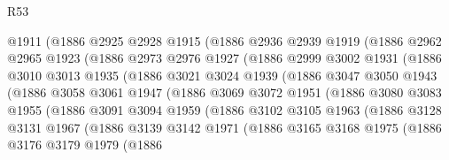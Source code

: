 \begin{lexlean}{R53}
\begin{coremodule}
              @1911
              (@1886
                @2925
                @2928
                @1915
                (@1886
                  @2936
                  @2939
                  @1919
                  (@1886
                    @2962
                    @2965
                    @1923
                    (@1886
                      @2973
                      @2976
                      @1927
                      (@1886
                        @2999
                        @3002
                        @1931
                        (@1886
                          @3010
                          @3013
                          @1935
                          (@1886
                            @3021
                            @3024
                            @1939
                            (@1886
                              @3047
                              @3050
                              @1943
                              (@1886
                                @3058
                                @3061
                                @1947
                                (@1886
                                  @3069
                                  @3072
                                  @1951
                                  (@1886
                                    @3080
                                    @3083
                                    @1955
                                    (@1886
                                      @3091
                                      @3094
                                      @1959
                                      (@1886
                                        @3102
                                        @3105
                                        @1963
                                        (@1886
                                          @3128
                                          @3131
                                          @1967
                                          (@1886
                                            @3139
                                            @3142
                                            @1971
                                            (@1886
                                              @3165
                                              @3168
                                              @1975
                                              (@1886
                                                @3176
                                                @3179
                                                @1979
                                                (@1886

\end{coremodule}
\end{lexlean}
